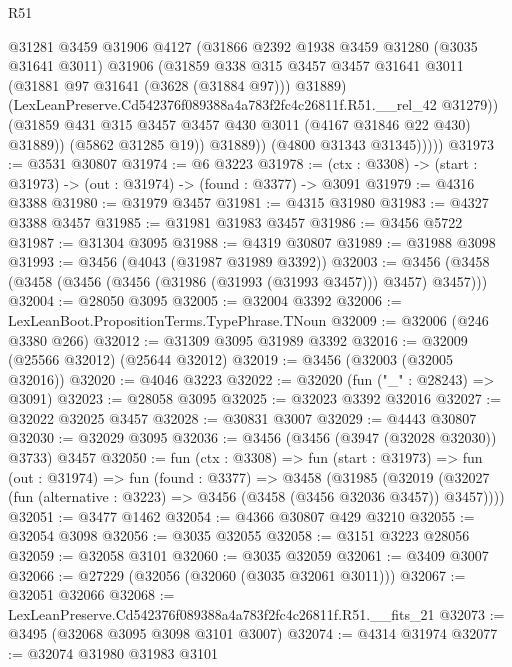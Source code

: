 \begin{lexlean}{R51}
\begin{coremodule}
                    @31281
                    @3459
                    @31906
                    @4127
                    (@31866
                      @2392
                      @1938
                      @3459
                      @31280
                      (@3035 @31641 @3011)
                      @31906
                      (@31859
                        @338
                        @315
                        @3457
                        @3457
                        @31641
                        @3011
                        (@31881 @97 @31641 (@3628 (@31884 @97)))
                        @31889)
                      (LexLeanPreserve.Cd542376f089388a4a783f2fc4c26811f.R51.__rel_42 @31279))
                    (@31859 @431 @315 @3457 @3457 @430 @3011 (@4167 @31846 @22 @430) @31889))
                  (@5862 @31285 @19))
                @31889))
            (@4800 @31343 @31345)))))
@31973 := @3531 @30807
@31974 := @6 @3223
@31978 := (ctx : @3308) -> (start : @31973) -> (out : @31974) -> (found : @3377) -> @3091
@31979 := @4316 @3388
@31980 := @31979 @3457
@31981 := @4315 @31980
@31983 := @4327 @3388 @3457
@31985 := @31981 @31983 @3457
@31986 := @3456 @5722
@31987 := @31304 @3095
@31988 := @4319 @30807
@31989 := @31988 @3098
@31993 := @3456 (@4043 (@31987 @31989 @3392))
@32003 := @3456 (@3458 (@3458 (@3456 (@3456 (@31986 (@31993 (@31993 @3457))) @3457) @3457)))
@32004 := @28050 @3095
@32005 := @32004 @3392
@32006 := LexLeanBoot.PropositionTerms.TypePhrase.TNoun
@32009 := @32006 (@246 @3380 @266)
@32012 := @31309 @3095 @31989 @3392
@32016 := @32009 (@25566 @32012) (@25644 @32012)
@32019 := @3456 (@32003 (@32005 @32016))
@32020 := @4046 @3223
@32022 := @32020 (fun ("_" : @28243) => @3091)
@32023 := @28058 @3095
@32025 := @32023 @3392 @32016
@32027 := @32022 @32025 @3457
@32028 := @30831 @3007
@32029 := @4443 @30807
@32030 := @32029 @3095
@32036 := @3456 (@3456 (@3947 (@32028 @32030)) @3733) @3457
@32050 := fun (ctx : @3308) =>
  fun (start : @31973) =>
  fun (out : @31974) =>
  fun (found : @3377) =>
  @3458
    (@31985
      (@32019 (@32027 (fun (alternative : @3223) => @3456 (@3458 (@3456 @32036 @3457)) @3457))))
@32051 := @3477 @1462
@32054 := @4366 @30807 @429 @3210
@32055 := @32054 @3098
@32056 := @3035 @32055
@32058 := @3151 @3223 @28056
@32059 := @32058 @3101
@32060 := @3035 @32059
@32061 := @3409 @3007
@32066 := @27229 (@32056 (@32060 (@3035 @32061 @3011)))
@32067 := @32051 @32066
@32068 := LexLeanPreserve.Cd542376f089388a4a783f2fc4c26811f.R51.__fits_21
@32073 := @3495 (@32068 @3095 @3098 @3101 @3007)
@32074 := @4314 @31974
@32077 := @32074 @31980 @31983 @3101

\end{coremodule}
\end{lexlean}
